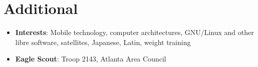 \documentclass[letterpaper,11pt]{article}
\newcommand{\resumeItem}[2]{
  \item\small{
    \textbf{#1}{: #2 \vspace{-2pt}}
  }
}
\newcommand{\resumeSubItem}[2]{\resumeItem{#1}{#2}\vspace{-4pt}}
\newcommand{\resumeSubHeadingListStart}{\begin{itemize}[leftmargin=*]}
\newcommand{\resumeSubHeadingListEnd}{\end{itemize}}
\begin{document}
\section{Additional}
  \resumeSubHeadingListStart
  \resumeSubItem{Interests}
                {Mobile technology, computer architectures, GNU/Linux and other libre software, satellites, Japanese, Latin, weight training}
                \resumeSubItem{Eagle Scout}
                              {Troop 2143, Atlanta Area Council}{}
  \resumeSubHeadingListEnd
\end{document}
